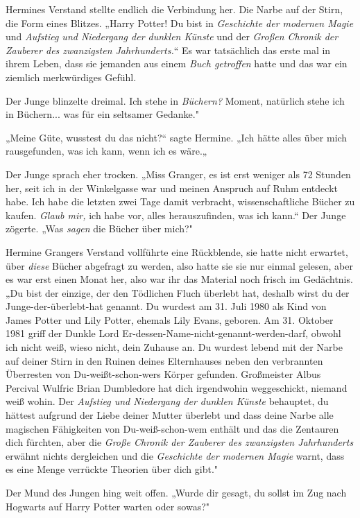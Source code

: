 {Hermines Verstand stellte endlich die Verbindung her. Die Narbe auf der Stirn, die Form eines Blitzes. „Harry Potter! Du bist in \emph{Geschichte der modernen Magie} und \emph{Aufstieg und Niedergang der dunklen Künste} und der \emph{Großen Chronik der Zauberer des zwanzigsten Jahrhunderts.}“ Es war tatsächlich das erste mal in ihrem Leben, dass sie jemanden aus einem \emph{Buch getroffen} hatte und das war ein ziemlich merkwürdiges Gefühl.

Der Junge blinzelte dreimal. Ich stehe in \emph{Büchern?} Moment, natürlich stehe ich in Büchern... was für ein seltsamer Gedanke."

„Meine Güte, wusstest du das nicht?“ sagte Hermine. „Ich hätte alles über mich rausgefunden, was ich kann, wenn ich es wäre.„

Der Junge sprach eher trocken. „Miss Granger, es ist erst weniger als 72 Stunden her, seit ich in der Winkelgasse war und meinen Anspruch auf Ruhm entdeckt habe. Ich habe die letzten zwei Tage damit verbracht, wissenschaftliche Bücher zu kaufen. \emph{Glaub mir,} ich habe vor, alles herauszufinden, was ich kann.“ Der Junge zögerte. „Was \emph{sagen} die Bücher über mich?"

Hermine Grangers Verstand vollführte eine Rückblende, sie hatte nicht erwartet, über \emph{diese} Bücher abgefragt zu werden, also hatte sie sie nur einmal gelesen, aber es war erst einen Monat her, also war ihr das Material noch frisch im Gedächtnis. „Du bist der einzige, der den Tödlichen Fluch überlebt hat, deshalb wirst du der Junge-der-überlebt-hat genannt. Du wurdest am 31. Juli 1980 als Kind von James Potter und Lily Potter, ehemals Lily Evans, geboren. Am 31. Oktober 1981 griff der Dunkle Lord Er-dessen-Name-nicht-genannt-werden-darf, obwohl ich nicht weiß, wieso nicht, dein Zuhause an. Du wurdest lebend mit der Narbe auf deiner Stirn in den Ruinen deines Elternhauses neben den verbrannten Überresten von Du-weißt-schon-wers Körper gefunden. Großmeister Albus Percival Wulfric Brian Dumbledore hat dich irgendwohin weggeschickt, niemand weiß wohin. Der \emph{Aufstieg und Niedergang der dunklen Künste} behauptet, du hättest aufgrund der Liebe deiner Mutter überlebt und dass deine Narbe alle magischen Fähigkeiten von Du-weiß-schon-wem enthält und das die Zentauren dich fürchten, aber die \emph{Große Chronik der Zauberer des zwanzigsten Jahrhunderts} erwähnt nichts dergleichen und die \emph{Geschichte der modernen Magie} warnt, dass es eine Menge verrückte Theorien über dich gibt."

Der Mund des Jungen hing weit offen. „Wurde dir gesagt, du sollst im Zug nach Hogwarts auf Harry Potter warten oder sowas?"

}
